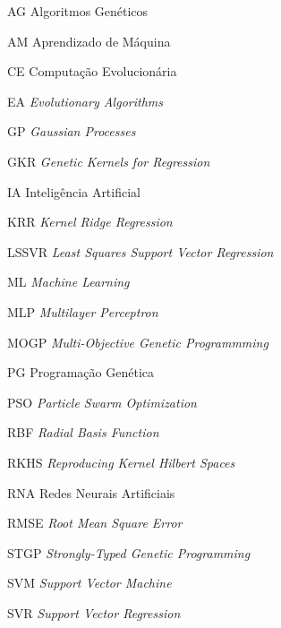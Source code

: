 \begin{siglas}
  \item[AG] Algoritmos Genéticos
  \item[AM] Aprendizado de Máquina
  \item[CE] Computação Evolucionária
  \item[EA] \textit{Evolutionary Algorithms}
  \item[GP] \textit{Gaussian Processes}
  \item[GKR] \textit{Genetic Kernels for Regression}
  \item[IA] Inteligência Artificial
  \item[KRR] \textit{Kernel Ridge Regression}
  \item[LSSVR] \textit{Least Squares Support Vector Regression}
  \item[ML] \textit{Machine Learning}
  \item[MLP] \textit{Multilayer Perceptron}
  \item[MOGP] \textit{Multi-Objective Genetic Programmming}
  \item[PG] Programação Genética
  \item[PSO] \textit{Particle Swarm Optimization}
  \item[RBF] \textit{Radial Basis Function}
  \item[RKHS] \textit{Reproducing Kernel Hilbert Spaces}
  \item[RNA] Redes Neurais Artificiais
  \item[RMSE] \textit{Root Mean Square Error}
  \item[STGP] \textit{Strongly-Typed Genetic Programming}
  \item[SVM] \textit{Support Vector Machine}
  \item[SVR] \textit{Support Vector Regression}
\end{siglas}
